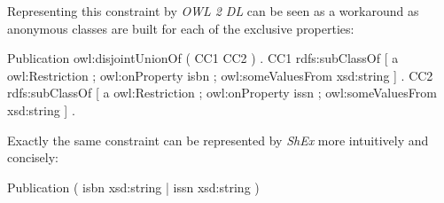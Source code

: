 \documentclass{acm_proc_article-sp}
\newcommand{\ms}[1]{%
  \texttt{#1}
}
\newenvironment{DL}{
  \vspace{0cm}
  \begin{tabular}{l l}

}{
  \end{tabular}
}
\begin{document}
Representing this constraint by \emph{OWL 2 DL} can be seen as a workaround 
as anonymous classes are built for each of the exclusive properties:
\begin{ex}
Publication owl:disjointUnionOf ( CC1 CC2 ) . 
CC1 rdfs:subClassOf [ a owl:Restriction ;
    owl:onProperty isbn ;
    owl:someValuesFrom xsd:string ] .
CC2 rdfs:subClassOf [ a owl:Restriction ;
    owl:onProperty issn ;
    owl:someValuesFrom xsd:string ] .
\end{ex}
Exactly the same constraint can be represented by \emph{ShEx} more intuitively and concisely:
\begin{ex}
Publication { ( isbn xsd:string | issn xsd:string ) }
\end{ex}

%
%
%
%
%
%
\end{document}
